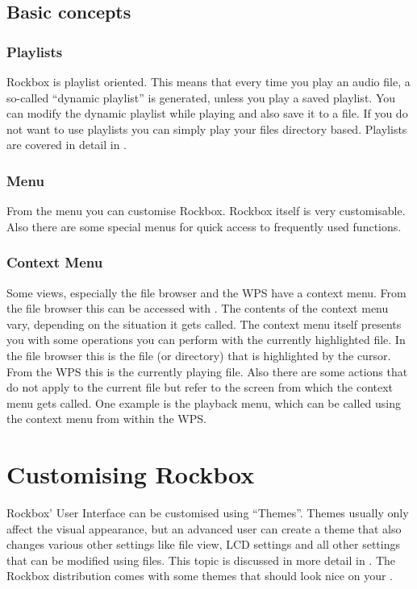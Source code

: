 \subsection{Basic concepts}
\subsubsection{Playlists}
Rockbox is playlist oriented. This means that every time you play an audio file,
a so-called ``dynamic playlist'' is generated, unless you play a saved
playlist. You can modify the dynamic playlist while playing and also save
it to a file. If you do not want to use playlists you can simply play your
files directory based.
Playlists are covered in detail in .

\subsubsection{Menu}
From the menu you can customise Rockbox. Rockbox itself is very customisable.
Also there are some special menus for quick access to frequently used
functions.

\subsubsection{Context Menu}
Some views, especially the file browser and the WPS have a context menu.
From the file browser this can be accessed with \ActionStdContext{}.
The contents of the context menu vary, depending on the situation it gets
called. The context menu itself presents you with some operations you can
perform with the currently highlighted file. In the file browser this is
the file (or directory) that is highlighted by the cursor. From the WPS this is
the currently playing file. Also there are some actions that do not apply
to the current file but refer to the screen from which the context menu
gets called. One example is the playback menu, which can be called using
the context menu from within the WPS.

\section{Customising Rockbox}
Rockbox' User Interface can be customised using ``Themes''. Themes usually
only affect the visual appearance, but an advanced user can create a theme
that also changes various other settings like file view, LCD settings and
all other settings that can be modified using  files. This topic
is discussed in more detail in .
The Rockbox distribution comes with some themes that should look nice on
your \dap{}. 

